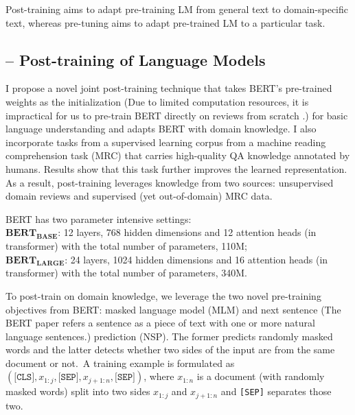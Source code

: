 Post-training aims to adapt pre-training LM from general text to domain-specific text, whereas pre-tuning aims to adapt pre-trained LM to a particular task.

\subsection{-- Post-training of Language Models}
\label{chap4:sec:post-training}

I propose a novel joint post-training technique that takes BERT's pre-trained weights as the initialization (Due to limited computation resources, it is impractical for us to pre-train BERT directly on reviews from scratch \cite{devlin2018bert}.) for basic language understanding and adapts BERT with domain knowledge.
I also incorporate tasks from a supervised learning corpus from a machine reading comprehension task (MRC) that carries high-quality QA knowledge annotated by humans.
Results show that this task further improves the learned representation.
As a result, post-training leverages knowledge from two sources: unsupervised domain reviews and supervised (yet out-of-domain) MRC data.

BERT has two parameter intensive settings:\\
\noindent
$\textbf{BERT}_\textbf{BASE}$: 12 layers, 768 hidden dimensions and 12 attention heads (in transformer) with the total number of parameters, 110M;\\
\noindent
$\textbf{BERT}_\textbf{LARGE}$: 24 layers, 1024 hidden dimensions and 16 attention heads (in transformer) with the total number of parameters, 340M.


To post-train on domain knowledge, we leverage the two novel pre-training objectives from BERT: masked language model (MLM) and next sentence (The BERT paper refers a sentence as a piece of text with one or more natural language sentences.) prediction (NSP). The former predicts randomly masked words and the latter detects whether two sides of the input are from the same document or not.~A training example is formulated as $(\texttt{[CLS]}, x_{1:j}, \texttt{[SEP]}, x_{j+1:n}, \texttt{[SEP]})$, where $x_{1:n}$ is a document (with randomly masked words) split into two sides $x_{1:j}$ and $x_{j+1:n}$ and \texttt{[SEP]} separates those two.

